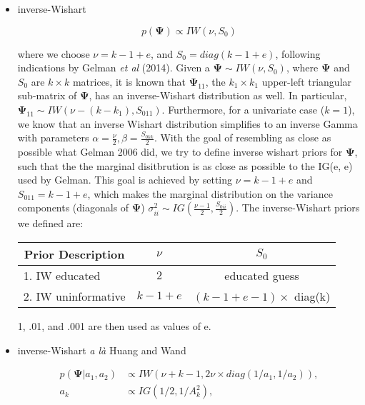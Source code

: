 \documentclass[a4paper]{article}
\begin{document}
\begin{itemize}
	\item inverse-Wishart
	
\begin{equation}
p(\bm{\Psi}) \propto IW(\nu, S_{0})
\end{equation}

where we choose $\nu = k-1+e$, and $S_{0}=diag(k-1+e)$, following 
indications by Gelman \textit{et al} (2014). Given a $\bm{\Psi} 
\sim IW(\nu, S_{0})$, where $\bm{\Psi}$ and $S_{0}$ are $k \times 
k$ matrices, it is known that $\bm{\Psi}_{11}$, the $k_1 \times 
k_1$ upper-left triangular sub-matrix of $\bm{\Psi}$, has an 
inverse-Wishart distribution as well. In particular, $\bm{\Psi}_{11} 
\sim IW(\nu-(k-k_1), S_{011})$. Furthermore, for a univariate case 
($k=1$), we know that an inverse Wishart distribution simplifies 
to an inverse Gamma with parameters $\alpha=\frac{\nu}{2}, \beta = 
\frac{S_{0kk}}{2}$. With the goal of resembling as close as possible 
what Gelman 2006 did, we try to define inverse wishart priors for 
$\bm{\Psi}$, such that the the marginal disitbrution is as close as 
possible to the IG(e, e) used by Gelman. This goal is achieved by 
setting $\nu = k-1+e$ and $S_{011} = k-1+e$, which makes the marginal 
distribution on the variance components (diagonals of $\bm{\Psi}$) 
$\sigma_{ii}^{2} \sim IG(\frac{\nu-1}{2},\frac{S_{0ii}}{2})$. The 
inverse-Wishart priors we defined are:

\begin{center}
\begin{tabular}{ c c c }
 Prior Description & $\nu$ & $S_{0}$ \\ 
 \hline
 \multicolumn{1}{l}{1. IW educated} & $2$ & educated guess \\
 \multicolumn{1}{l}{2. IW uninformative} & $k-1+e$ & $(k-1+e-1)\times$ diag(k) \\  
 \hline
\end{tabular}
\end{center}
1, .01, and .001 are then used as values of e.

	\item inverse-Wishart \textit{a là} Huang and Wand

\begin{equation}
	\begin{split}
	p(\bm{\Psi}|a_1, a_2)& \propto IW(\nu + k - 1, 2\nu \times diag(1/a_1, 1/a_2)), \\
	a_k& \propto IG(1/2,1/A_k^2),
	\end{split}
\end{equation}


\end{itemize}
\end{document}
